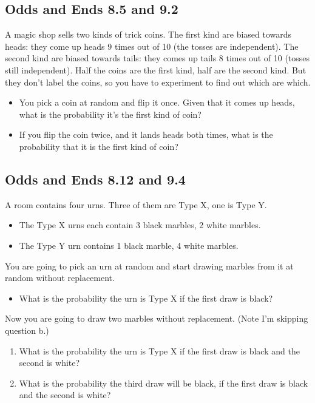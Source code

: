 \documentclass[
  11pt,
]{article}
\providecommand{\tightlist}{%
  \setlength{\itemsep}{0pt}\setlength{\parskip}{0pt}}
\begin{document}
\hypertarget{odds-and-ends-8.5-and-9.2}{%
\subsection{Odds and Ends 8.5 and 9.2}\label{odds-and-ends-8.5-and-9.2}}

A magic shop sells two kinds of trick coins. The first kind are biased
towards heads: they come up heads 9 times out of 10 (the tosses are
independent). The second kind are biased towards tails: they comes up
tails 8 times out of 10 (tosses still independent). Half the coins are
the first kind, half are the second kind. But they don't label the
coins, so you have to experiment to find out which are which.

\begin{itemize}
\tightlist
\item
  You pick a coin at random and flip it once. Given that it comes up
  heads, what is the probability it's the first kind of coin?
\item
  If you flip the coin twice, and it lands heads both times, what is the
  probability that it is the first kind of coin?
\end{itemize}

\hypertarget{odds-and-ends-8.12-and-9.4}{%
\subsection{Odds and Ends 8.12 and
9.4}\label{odds-and-ends-8.12-and-9.4}}

A room contains four urns. Three of them are Type X, one is Type Y.

\begin{itemize}
\tightlist
\item
  The Type X urns each contain 3 black marbles, 2 white marbles.
\item
  The Type Y urn contains 1 black marble, 4 white marbles.
\end{itemize}

You are going to pick an urn at random and start drawing marbles from it
at random without replacement.

\begin{itemize}
\tightlist
\item
  What is the probability the urn is Type X if the first draw is black?
\end{itemize}

Now you are going to draw two marbles without replacement. (Note I'm
skipping question b.)

\begin{enumerate}
\def\labelenumi{\alph{enumi}.}
\tightlist
\item
  What is the probability the urn is Type X if the first draw is black
  and the second is white? \setcounter{enumi}{2}
\item
  What is the probability the third draw will be black, if the first
  draw is black and the second is white?
\end{enumerate}
\end{document}
